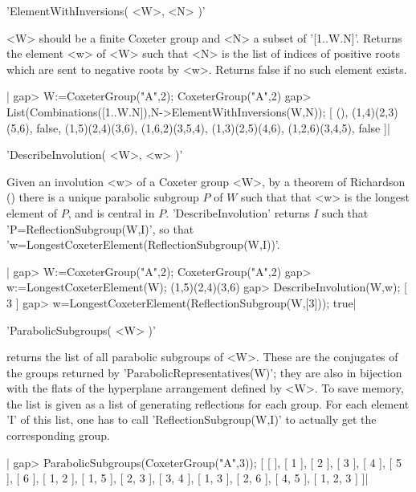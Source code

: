 
'ElementWithInversions( <W>, <N> )'

<W>  should  be  a  finite  Coxeter  group  and <N> a subset of '[1..W.N]'.
Returns  the element  <w> of  <W> such  that <N>  is the  list of indices of
positive roots which are sent to negative roots by <w>. Returns false if no
such element exists.

|    gap> W:=CoxeterGroup("A",2);
    CoxeterGroup("A",2)
    gap> List(Combinations([1..W.N]),N->ElementWithInversions(W,N));
    [ (), (1,4)(2,3)(5,6), false, (1,5)(2,4)(3,6), (1,6,2)(3,5,4),
      (1,3)(2,5)(4,6), (1,2,6)(3,4,5), false ]|


'DescribeInvolution( <W>, <w> )'

Given  an involution <w> of a Coxeter group <W>, by a theorem of Richardson
(\cite{rich82})  there is a unique parabolic  subgroup $P$ of $W$ such that
that   <w>  is  the  longest  element  of  $P$,  and  is  central  in  $P$.
'DescribeInvolution'  returns $I$ such that 'P=ReflectionSubgroup(W,I)', so
that 'w=LongestCoxeterElement(ReflectionSubgroup(W,I))'.

|    gap> W:=CoxeterGroup("A",2);
    CoxeterGroup("A",2)
    gap> w:=LongestCoxeterElement(W);
    (1,5)(2,4)(3,6)
    gap> DescribeInvolution(W,w);
    [ 3 ]
    gap> w=LongestCoxeterElement(ReflectionSubgroup(W,[3]));
    true|


'ParabolicSubgroups( <W> )'

returns  the  list  of  all  parabolic  subgroups  of  <W>.  These  are the
conjugates  of the  groups returned  by 'ParabolicRepresentatives(W)'; they
are  also in bijection with the flats of the hyperplane arrangement defined
by  <W>.  To  save  memory,  the  list  is  given  as  a list of generating
reflections  for each group. For each element  'I' of this list, one has to
call 'ReflectionSubgroup(W,I)' to actually get the corresponding group.

|    gap> ParabolicSubgroups(CoxeterGroup("A",3));
    [ [  ], [ 1 ], [ 2 ], [ 3 ], [ 4 ], [ 5 ], [ 6 ], [ 1, 2 ], [ 1, 5 ],
      [ 2, 3 ], [ 3, 4 ], [ 1, 3 ], [ 2, 6 ], [ 4, 5 ], [ 1, 2, 3 ] ]|

